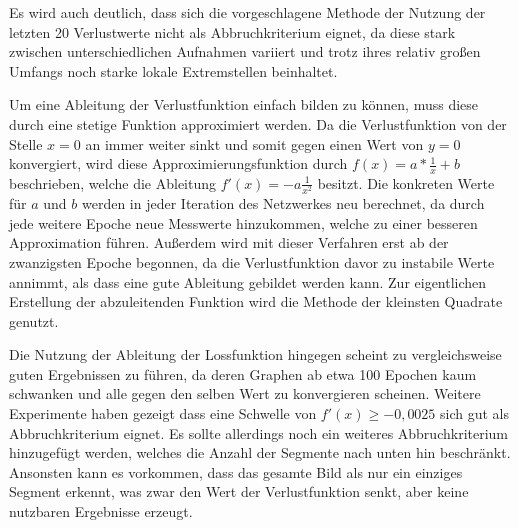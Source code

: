 Es wird auch deutlich, dass sich die vorgeschlagene Methode der Nutzung der letzten 20 Verlustwerte nicht als Abbruchkriterium eignet, da diese stark zwischen unterschiedlichen Aufnahmen variiert und trotz ihres relativ großen Umfangs noch starke lokale Extremstellen beinhaltet.

Um eine Ableitung der Verlustfunktion einfach bilden zu können, muss diese durch eine stetige Funktion approximiert werden. Da die Verlustfunktion von der Stelle $x=0$ an immer weiter sinkt und somit gegen einen Wert von $y=0$ konvergiert, wird diese Approximierungsfunktion durch $f(x) = a*\frac{1}{x}+b$ beschrieben, welche die Ableitung $f'(x)=-a\frac{1}{x^2}$ besitzt. Die konkreten Werte für $a$ und $b$ werden in jeder Iteration des Netzwerkes neu berechnet, da durch jede weitere Epoche neue Messwerte hinzukommen, welche zu einer besseren Approximation führen. Außerdem wird mit dieser Verfahren erst ab der zwanzigsten Epoche begonnen, da die Verlustfunktion davor zu instabile Werte annimmt, als dass eine gute Ableitung gebildet werden kann. Zur eigentlichen Erstellung der abzuleitenden Funktion wird die Methode der kleinsten Quadrate genutzt.

Die Nutzung der Ableitung der Lossfunktion hingegen scheint zu vergleichsweise guten Ergebnissen zu führen, da deren Graphen ab etwa 100 Epochen kaum schwanken und alle gegen den selben Wert zu konvergieren scheinen. Weitere Experimente haben gezeigt dass eine Schwelle von $f'(x)\geq-0,0025$ sich gut als Abbruchkriterium eignet. Es sollte allerdings noch ein weiteres Abbruchkriterium hinzugefügt werden, welches die Anzahl der Segmente nach unten hin beschränkt. Ansonsten kann es vorkommen, dass das gesamte Bild als nur ein einziges Segment erkennt, was zwar den Wert der Verlustfunktion senkt, aber keine nutzbaren Ergebnisse erzeugt.

